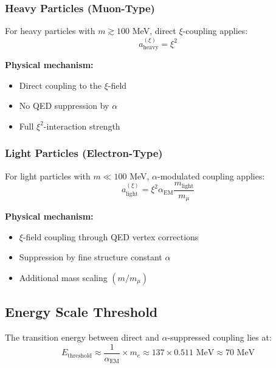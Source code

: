 \documentclass[12pt,a4paper]{article}
\newcommand{\xipar}{\xi}
\newcommand{\alphaEM}{\alpha_{\text{EM}}}
\begin{document}
	\subsubsection{Heavy Particles (Muon-Type)}
	
	For heavy particles with $m \gtrsim 100$ MeV, direct $\xipar$-coupling applies:
	\begin{equation}
		a_{\text{heavy}}^{(\xipar)} = \xipar^2
	\end{equation}
	
	\textbf{Physical mechanism:}
	\begin{itemize}
		\item Direct coupling to the $\xipar$-field
		\item No QED suppression by $\alpha$
		\item Full $\xipar^2$-interaction strength
	\end{itemize}
	
	\subsubsection{Light Particles (Electron-Type)}
	
	For light particles with $m \ll 100$ MeV, $\alpha$-modulated coupling applies:
	\begin{equation}
		a_{\text{light}}^{(\xipar)} = \xipar^2 \alphaEM \frac{m_{\text{light}}}{m_\mu}
	\end{equation}
	
	\textbf{Physical mechanism:}
	\begin{itemize}
		\item $\xipar$-field coupling through QED vertex corrections
		\item Suppression by fine structure constant $\alpha$
		\item Additional mass scaling $(m/m_\mu)$
	\end{itemize}
	
	\subsection{Energy Scale Threshold}
	
	The transition energy between direct and $\alpha$-suppressed coupling lies at:
	\begin{equation}
		E_{\text{threshold}} \approx \frac{1}{\alphaEM} \times m_e \approx 137 \times 0.511 \text{ MeV} \approx 70 \text{ MeV}
	\end{equation}
	
\end{document}
